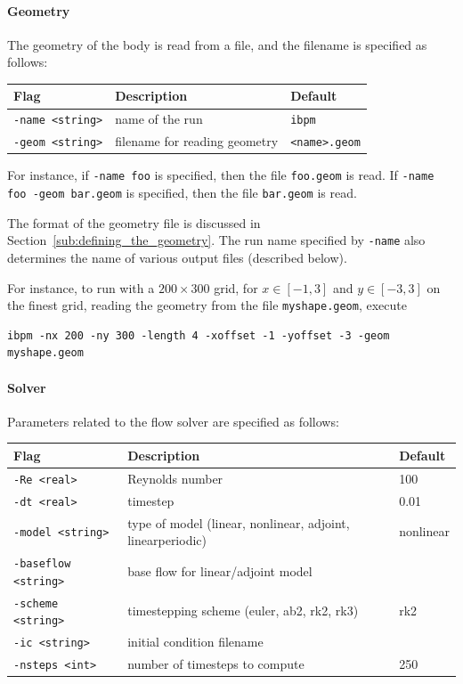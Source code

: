 \documentclass[11pt]{article}
\begin{document}
\paragraph{Geometry}
The geometry of the body is read from a file, and the filename is specified as follows:
\begin{center}
\begin{tabular}{lll}
Flag & Description & Default\\
\hline
\verb|-name <string>|    & name of the run & {\tt ibpm}\\
\verb|-geom <string>|    & filename for reading geometry & \verb|<name>.geom|
\end{tabular}
\end{center}
For instance, if {\tt -name foo} is specified, then the file {\tt foo.geom} is read.  If {\tt -name foo -geom bar.geom} is specified, then the file {\tt bar.geom} is read.

The format of the geometry file is discussed in Section~\ref{sub:defining_the_geometry}. The run name specified by {\tt -name} also determines the name of various output files (described below).

For instance, to run with a $200\times 300$ grid, for $x\in[-1,3]$ and $y\in [-3,3]$ on the finest grid, reading the geometry from the file {\tt myshape.geom}, execute
\begin{Verbatim}
ibpm -nx 200 -ny 300 -length 4 -xoffset -1 -yoffset -3 -geom myshape.geom
\end{Verbatim}


\paragraph{Solver}
Parameters related to the flow solver are specified as follows:

\begin{center}
\begin{tabular}{lp{2.3in}l}
Flag & Description & Default\\
\hline
\verb|-Re <real>|        & Reynolds number & 100\\
\verb|-dt <real>|        & timestep & 0.01\\
\verb|-model <string>|   & type of model (linear, nonlinear, adjoint, linearperiodic) & nonlinear\\
\verb|-baseflow <string>| & base flow for linear/adjoint model\\
\verb|-scheme <string>|   & timestepping scheme (euler, ab2, rk2, rk3) & rk2\\
\verb|-ic <string>|       & initial condition filename \\
\verb|-nsteps <int>|    & number of timesteps to compute & 250\\
\end{tabular}
\end{center}
\end{document}
